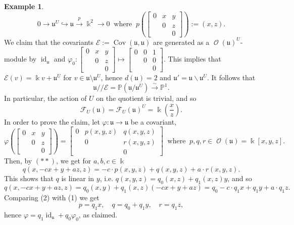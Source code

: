 \documentclass{amsart}
\theoremstyle{definition}
\newtheorem{exa}[thm]{Example}
\theoremstyle{remark}
\begin{document}
\begin{exa}
$$
0\to {\mathfrak u}^{U} {\hookrightarrow} {\mathfrak u} \overset{p}{\to} {\Bbbk}^{2}\to 0 \ \text{ where }\ p({\left[\begin{smallmatrix}0&x&y\\&0&z\\&&0\end{smallmatrix}\right]}):=(x,z).
$$
We claim that  the covariants ${\mathcal E}:=\operatorname{Cov}({\mathfrak u},{\mathfrak u})$ are generated as a $\operatorname{\mathcal O}({\mathfrak u})^{U}$-module by $\operatorname{id}_{\mathfrak u}$ and ${\varphi}_{0}\colon  {\left[\begin{smallmatrix}0&x&y\\&0&z\\&&0\end{smallmatrix}\right]} \mapsto {\left[\begin{smallmatrix}0&0&1\\&0&0\\&&0\end{smallmatrix}\right]}$.
This implies that ${\mathcal E}(v) = {\Bbbk} v +{\mathfrak u}^{U}$ for $v\in{\mathfrak u}\setminus {\mathfrak u}^{U}$, hence $d({\mathfrak u}) = 2$ and ${\mathfrak u}'={\mathfrak u}\smallsetminus {\mathfrak u}^{U}$. It follows that  
$$
{\mathfrak u}{/\!\!/} {\mathcal E} = {\mathbb P}({\mathfrak u}/{\mathfrak u}^{U}){\xrightarrow{\sim}} {\mathbb P}^{1}.
$$ 
In particular, the action of $U$ on the quotient is trivial, and so 
$$
{\mathcal F}_{U}({\mathfrak u}) = {\mathcal F}_{U}({\mathfrak u})^{U}={\Bbbk}(\frac{x}{z}).
$$
In order to prove the claim, let ${\varphi}\colon {\mathfrak u} \to {\mathfrak u}$ be a covariant, 
$$
{\varphi}({\left[\begin{smallmatrix}0&x&y\\&0&z\\&&0\end{smallmatrix}\right]})={\left[\begin{smallmatrix}0&{p(x,y,z)}&{q(x,y,z)}\\&0&{r(x,y,z)}\\&&0\end{smallmatrix}\right]}\ \text{ where }\ p,q,r \in \operatorname{\mathcal O}({\mathfrak u})={\Bbbk}[x,y,z].
$$
Then, by $(**)$, we get for $a,b,c\in {\Bbbk}$
\[\tag{1}
q(x,-c x + y + a z,z) = -c\cdot p(x,y,z)+q(x,y,z)+a\cdot r(x,y,z).
\]
This shows that $q$ is linear in $y$, i.e. $q(x,y,z) = q_{0}(x,z) + q_{1}(x,z)y$, and so
\[\tag{2}
q(x,-c x + y + a z,z) = q_{0}(x,y) + q_{1}(x,z)(-c x + y + a z) = q_{0} -c\cdot q_{1}x+ q_{1}y + a\cdot q_{1}z .
\]
Comparing (2) with (1) we get
\[\tag{3}
p= q_{1} x, \quad q = q_{0} + q_{1}y, \quad r = q_{1}z,
\]
hence ${\varphi} = q_{1}\operatorname{id}_{\mathfrak u}+ q_{0}{\varphi}_{0}$, as claimed.
\end{exa}
\end{document}

